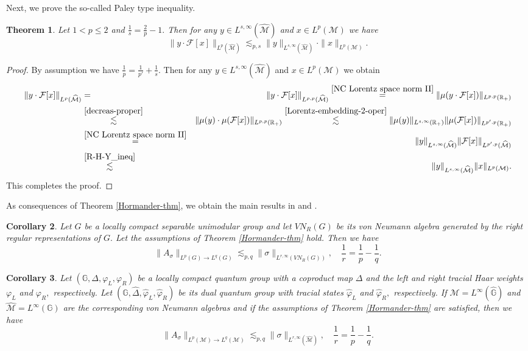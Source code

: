 \documentclass[a4paper,12pt]{amsart}
\newtheorem{thm}{Theorem}[section]
\newtheorem{cor}[thm]{Corollary}
\numberwithin{equation}{section}
\theoremstyle{definition}
\begin{document}
 Next, we prove the so-called Paley type inequality.
 \begin{thm}\label{Paley-ineq}Let  $1<p\leq2$ and $\frac{1}{s}=\frac{2}{p}-1.$ Then for any $y\in L^{s,\infty}(\widehat{\mathcal{M}})$ and $x\in L^p(\mathcal{M})$ we have
$$
\|y\cdot\mathcal{F}[x]\|_{L^p(\widehat{\mathcal{M}})}\lesssim_{p,s}  \|y\|_{L^{s,\infty}(\widehat{\mathcal{M}})}\cdot\|x\|_{L^p(\mathcal{M})}.$$ 
\end{thm}
\begin{proof} By assumption we have $\frac{1}{p}=\frac{1}{p'} + \frac{1}{s}.$ Then for any $y\in L^{s,\infty}(\widehat{\mathcal{M}})$ and $x\in L^p(\mathcal{M})$ we obtain
\begin{eqnarray*}\|y\cdot\mathcal{F}[x]\|_{L^p(\widehat{\mathcal{M}})}&=&\|y\cdot\mathcal{F}[x]\|_{L^{p,p}(\widehat{\mathcal{M}})}\overset{\eqref{NC Lorentz space norm II}}{=}\|\mu(y\cdot\mathcal{F}[x])\|_{L^{p,p}(\mathbb{R}_+)}\\
&\overset{\eqref{decreas-proper}}{\lesssim}&\|\mu(y)\cdot\mu(\mathcal{F}[x])\|_{L^{p,p}(\mathbb{R}_+)}\overset{\eqref{Lorentz-embedding-2-oper}}{\lesssim}\|\mu(y)\|_{L^{s,\infty}(\mathbb{R}_+)}\|\mu(\mathcal{F}[x])\|_{L^{p',p}(\mathbb{R}_+)}\\
&\overset{\eqref{NC Lorentz space norm II}}{=}&\|y\|_{L^{s,\infty}(\widehat{\mathcal{M}})}\|\mathcal{F}[x]\|_{L^{p',p}(\widehat{\mathcal{M}})}\\
&\overset{\eqref{R-H-Y_ineq}}{\lesssim}&\|y\|_{L^{s,\infty}(\widehat{\mathcal{M}})}\|x\|_{L^{p}(\mathcal{M})}.
\end{eqnarray*}
This completes the proof.
\end{proof}
As consequences of Theorem \ref{Hormander-thm}, we obtain the main results in \cite[Theorem 5.1]{AR} and \cite[Theorem 1.3]{Z}.

\begin{cor}\label{cor-1}Let $G$ be a locally compact separable unimodular group and let $VN_{R}(G)$ be its von Neumann algebra generated by the right regular representations of $G.$ Let the assumptions of Theorem \ref{Hormander-thm} hold. Then we have 
$$\|A_\sigma\|_{L^p(G) \rightarrow L^q(G)}\lesssim_{p,q}  \|\sigma\|_{L^{r,\infty}(VN_{R}(G))}, \quad \frac{1}{r}= \frac{1}{p} - \frac{1}{q}.$$
\end{cor}
\begin{cor}\label{cor-2}Let $\left(\mathbb{G}, \Delta, \varphi_{L}, \varphi_{R}\right)$ be a locally compact quantum group with a coproduct map $\Delta$ and the left and right tracial Haar weights $\varphi_{L}$ and $\varphi_{R},$  respectively. Let $\left(\widehat{\mathbb{G}}, \widehat{\Delta}, \widehat{\varphi}_{L}, \widehat{\varphi}_{R}\right)$ be its dual quantum group with tracial states $\widehat{\varphi}_{L}$ and $\widehat{\varphi}_{R},$ respectively.
If $\mathcal{M}=L^{\infty}(\widehat{\mathbb{G}})$ and $\widehat{\mathcal{M}}=L^{\infty}(\mathbb{G})$ are the corresponding von Neumann
algebras and if the assumptions of Theorem \ref{Hormander-thm} are satisfied, then we have 
$$\|A_\sigma\|_{L^p(\mathcal{M}) \rightarrow L^q(\mathcal{M})}\lesssim_{p,q}  \|\sigma\|_{L^{r,\infty}(\mathcal{\widehat{M}})}, \quad \frac{1}{r}= \frac{1}{p} - \frac{1}{q}.$$
\end{cor}
\end{document}

